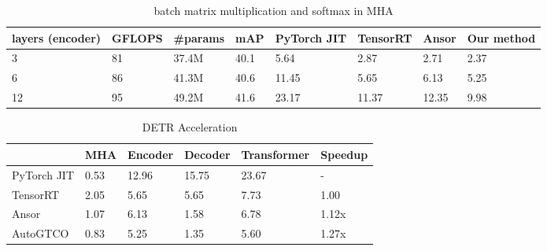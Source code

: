 \begin{table*}[htbp]
    \caption{batch matrix multiplication and softmax in MHA}
    \centering
    \begin{tabular}{|l|l|l|l|l|l|l|l|}
    \hline
    layers (encoder) & GFLOPS & \#params & mAP  & PyTorch JIT & TensorRT & Ansor & Our method  \\ \hline
    3                & 81     & 37.4M    & 40.1 & 5.64        & 2.87     & 2.71  & 2.37        \\ \hline
    6                & 86     & 41.3M    & 40.6 & 11.45       & 5.65    & 6.13  & 5.25         \\ \hline
    12               & 95     & 49.2M    & 41.6 & 23.17       & 11.37    &  12.35     &  9.98            \\ \hline
    \end{tabular}
\end{table*}


\begin{table*}[htbp]
    \caption{dynamic programming for operator fusion on DETR}
    \centering
\end{table*}


\begin{table*}[htbp]
    \caption{DETR Acceleration}
    \centering
    \begin{tabular}{|l|l|l|l|l|l|}
    \hline
                & MHA  & Encoder & Decoder & Transformer & Speedup \\ \hline
    PyTorch JIT & 0.53 & 12.96   & 15.75   & 23.67       & -   \\ \hline
    TensorRT    & 2.05 & 5.65    & 5.65    & 7.73        & 1.00    \\ \hline
    Ansor       & 1.07 & 6.13    & 1.58    & 6.78        & 1.12x   \\ \hline
    AutoGTCO    & 0.83 & 5.25    & 1.35    & 5.60        & 1.27x   \\ \hline
    \end{tabular}
\end{table*}


